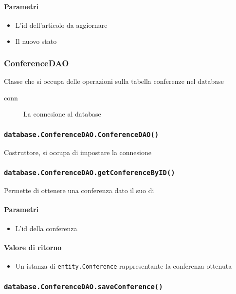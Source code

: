 \paragraph{Parametri}
\begin{itemize}
\item L'id dell'articolo da aggiornare
\item Il nuovo stato
\end{itemize}


\subsubsection{ConferenceDAO}
Classe che si occupa delle operazioni sulla tabella conferenze nel database
\begin{description}
\item[conn] La connesione al database
\end{description}

\subsubsection{\texttt{database.ConferenceDAO.ConferenceDAO()}}
Costruttore, si occupa di impostare la connesione

\subsubsection{\texttt{database.ConferenceDAO.getConferenceByID()}}
Permette di ottenere una conferenza dato il suo di
\paragraph{Parametri}
\begin{itemize}
\item L'id della conferenza
\end{itemize}
\paragraph{Valore di ritorno}
\begin{itemize}
\item Un istanza di \texttt{entity.Conference} rappresentante la conferenza ottenuta
\end{itemize}

\subsubsection{\texttt{database.ConferenceDAO.saveConference()}}
